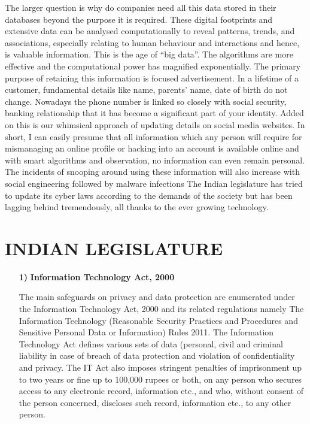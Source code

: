 \begin{multicols}{2}
The larger question is why do companies need all this data stored in their databases beyond the purpose it is required. These digital footprints and extensive data can be analysed computationally to reveal patterns, trends, and associations, especially relating to human behaviour and interactions and hence, is valuable information. This is the age of “big data”. The algorithms are more effective and the computational power has magnified exponentially. The primary purpose of retaining this information is focused advertisement. In a lifetime of a customer, fundamental details like name, parents’ name, date of birth do not change. Nowadays the phone number is linked so closely with social security, banking relationship that it has become a significant part of your identity. Added on this is our whimsical approach of updating details on social media websites. In short, I can easily presume that all information which any person will require for mismanaging an online profile or hacking into an account is available online and with smart algorithms and observation, no information can even remain personal. The incidents of snooping around using these information will also increase with social engineering followed by malware infections The Indian legislature has tried to update its cyber laws according to the demands of the society but has been lagging behind tremendously, all thanks to the ever growing technology.

\section{INDIAN LEGISLATURE}

\begin{itemize}

\item[{\bf 1)}] \textbf{Information Technology Act, 2000}

The main safeguards on privacy and data protection are enumerated under the Information Technology Act, 2000 and its related regulations namely The Information Technology (Reasonable Security Practices and Procedures and Sensitive Personal Data or Information) Rules 2011. The Information Technology Act defines various sets of data (personal, civil and criminal liability in case of breach of data protection and violation of confidentiality and privacy. The IT Act also imposes stringent penalties of imprisonment up to two years or fine up to 100,000 rupees or both, on any person who secures access to any electronic record, information etc., and who, without consent of the person concerned, discloses such record, information etc., to any other person. 


\end{itemize}
\end{multicols}

